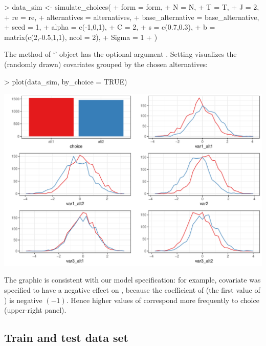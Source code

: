 \documentclass[article]{jss}
\newcommand{\class}[1]{`\code{#1}'}
\newcommand{\fct}[1]{\code{#1()}}
\begin{document}
\begin{Schunk}
\begin{Sinput}
> data_sim <- simulate_choices(
+    form = form,
+    N = N,
+    T = T,
+    J = 2,
+    re = re,
+    alternatives = alternatives,
+    base_alternative = base_alternative,
+    seed = 1,
+    alpha = c(-1,0,1),
+    C = 2,
+    s = c(0.7,0.3),
+    b = matrix(c(2,-0.5,1,1), ncol = 2),
+    Sigma = 1
+  )
\end{Sinput}
\end{Schunk}

The \fct{plot} method of \class{RprobitB\_data} object has the optional argument . Setting  visualizes the (randomly drawn) covariates grouped by the chosen alternatives:

\begin{Schunk}
\begin{Sinput}
> plot(data_sim, by_choice = TRUE)
\end{Sinput}
\end{Schunk}
\includegraphics{rprobitb_oelschlaeger_bauer-sim-data}

The graphic is consistent with our model specification: for example, covariate  was specified to have a negative effect on , because the coefficient of  (the first value of ) is negative $(-1)$. Hence higher values of  correspond more frequently to choice  (upper-right panel).

\subsection{Train and test data set} \label{subsec:train_test}
\end{document}

